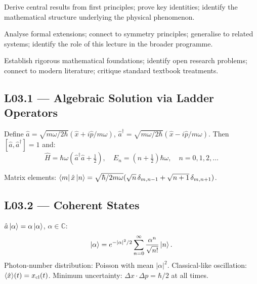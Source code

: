 \quad
Derive central results from first principles; prove key identities; identify
the mathematical structure underlying the physical phenomenon.

\quad
Analyse formal extensions; connect to symmetry principles; generalise to
related systems; identify the role of this lecture in the broader programme.

\quad
Establish rigorous mathematical foundations; identify open research problems;
connect to modern literature; critique standard textbook treatments.


\subsection*{L03.1 — Algebraic Solution via Ladder Operators}
\begin{tcolorbox}[lecturebox, title={Ladder Operator Algebra}]
Define $\hat{a} = \sqrt{m\omega/2\hbar}(\hat{x}+i\hat{p}/m\omega)$,
$\hat{a}^\dagger = \sqrt{m\omega/2\hbar}(\hat{x}-i\hat{p}/m\omega)$.
Then $[\hat{a},\hat{a}^\dagger]=1$ and:
\begin{equation}
  \hat{H} = \hbar\omega\!\left(\hat{a}^\dagger\hat{a}+\tfrac{1}{2}\right), \quad
  E_n = \left(n+\tfrac{1}{2}\right)\hbar\omega, \quad n=0,1,2,\ldots
  \label{eq:L03.1}
\end{equation}
\end{tcolorbox}
Matrix elements: $\bra{m}\hat{x}\ket{n}=\sqrt{\hbar/2m\omega}(\sqrt{n}\,\delta_{m,n-1}
+\sqrt{n+1}\,\delta_{m,n+1})$.

\subsection*{L03.2 — Coherent States}
\begin{tcolorbox}[lecturebox, title={Coherent State}]
$\hat{a}\ket{\alpha}=\alpha\ket{\alpha}$, $\alpha\in\mathbb{C}$:
\begin{equation}
  \ket{\alpha} = e^{-|\alpha|^2/2}\sum_{n=0}^\infty \frac{\alpha^n}{\sqrt{n!}}\ket{n}.
  \label{eq:L03.2}
\end{equation}
Photon-number distribution: Poisson with mean $|\alpha|^2$.
Classical-like oscillation: $\langle\hat{x}\rangle(t) = x_{\rm cl}(t)$.
Minimum uncertainty: $\Delta x\cdot\Delta p = \hbar/2$ at all times.
\end{tcolorbox}

